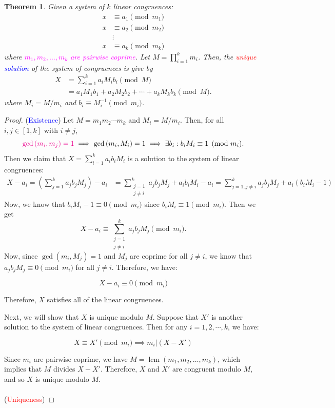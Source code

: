 \documentclass{article}
\newcommand{\inv}[1]{#1^{-1}}
\newtheorem*{theorem*}{Theorem}
\theoremstyle{definition}
\newcommand{\of}[1]{\left( #1 \right)}
\begin{document}
	\begin{tcolorbox}[colback=white,colframe=thmcolor,arc=5pt,title={\color{white}\bf Chinese Remainder Theorem ($\mathsf{CRT}$)}]
		\begin{theorem*}
			Given a system of $k$ linear congruences:
			\begin{align*}
			x&\equiv a_1 \pmod{m_1}\\
			x&\equiv a_2 \pmod{m_2}\\
			&\vdots \\
			x&\equiv a_k \pmod{m_k}
			\end{align*} where \textcolor{magenta}{$m_1,m_2,\dots, m_k$ are pairwise coprime}. Let $M=\prod_{i=1}^km_i$. Then, the \textcolor{red}{unique} \textcolor{blue}{solution} of the system of congruences is give by \begin{align*}
			X&=\sum_{i=1}^ka_iM_ib_i\pmod{M}\\
			&=a_1M_1b_1+a_2M_2b_2+\cdots+a_kM_kb_k\pmod{M}.
			\end{align*} where $M_i=M/m_i$ and $ b_i\equiv\inv{M_i}\pmod{m_i}$.
		\end{theorem*}
	\end{tcolorbox}
	\begin{proof}
		(\textcolor{blue}{Existence}) Let $M=m_1m_2\cdots m_k$ and $M_i=M/m_i$. Then, for all $i,j\in[1,k]$ with $i\neq j$, \[
		\textcolor{magenta}{\gcd\of{m_i,m_j}=1}\implies\gcd\of{m_i, M_i}=1\implies \exists b_i: b_iM_i\equiv1\pmod{m_i}. 
		\] Then we claim that $X=\sum_{i=1}^k a_i b_i M_i$ is a solution to the system of linear congruences: \begin{align*}
		X-a_i=\of{\sum_{j=1}^k a_j b_j M_j} - a_i&=\sum_{\substack{j=1\\ j\neq i}}^k a_j b_j M_j + a_ib_iM_i-a_i
		=\sum_{j=1,j\neq i}^k a_j b_j M_j + a_i(b_iM_i - 1)
		\end{align*}
		Now, we know that $
		b_iM_i-1\equiv 0\pmod{m_i}$ since $b_iM_i\equiv 1\pmod{m_i}$. Then we get \[
		X-a_i\equiv \sum_{\substack{j=1\\ j\neq i}}^k a_j b_j M_j \pmod{m_i}.
		\]
		Now, since $\gcd\of{m_i, M_j}=1$ and $M_j$ are coprime for all $j \neq i$, we know that $a_j b_j M_j \equiv 0 \pmod{m_i}$ for all $j \neq i$. Therefore, we have:
		
		$$X-a_i \equiv 0 \pmod{m_i}$$
		
		Therefore, $X$ satisfies all of the linear congruences.
		
		Next, we will show that $X$ is unique modulo $M$. Suppose that $X'$ is another solution to the system of linear congruences. Then for any $i=1,2,\cdots, k$, we have:
		
		$$X \equiv X' \pmod{m_i} \implies m_i | (X-X')$$
		
		Since $m_i$ are pairwise coprime, we have $M=\operatorname{lcm}(m_1, m_2, \ldots, m_k)$, which implies that $M$ divides $X-X'$. Therefore, $X$ and $X'$ are congruent modulo $M$, and so $X$ is unique modulo $M$.\\
		\\
		(\textcolor{red}{Uniqueness})
	\end{proof}
	
\end{document}
